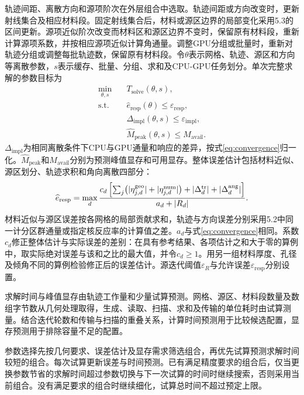 \documentclass[UTF8, zihao=-4, fontset=none, a4paper]{ctexart}
\begin{document}
轨迹间距、离散方向和源项阶次在外层组合中选取。轨迹间距或方向改变时，更新射线集合及相应材料段。固定射线集合后，材料或源区边界的局部变化采用5.3的区间更新。源项近似阶次改变而材料区和源区边界不变时，保留原有材料段，重新计算源项系数，并按相应源项近似计算角通量。调整GPU分组或批量时，重新对轨迹分组或调整每批轨迹数，保留原有材料段。令$\theta$表示网格、轨迹、源区和方向等离散参数，$s$表示缓存、批量、分组、求和及CPU-GPU任务划分。单次完整求解的参数目标为
\begin{equation}
\begin{aligned}
\min_{\theta,s}\quad &T_{\mathrm{solve}}(\theta,s),\\
\text{s.t.}\quad &\widehat e_{\mathrm{resp}}(\theta)\leq\varepsilon_{\mathrm{resp}},\\
&\Delta_{\mathrm{impl}}(\theta,s)\leq\varepsilon_{\mathrm{impl}},\\
&\widehat M_{\mathrm{peak}}(\theta,s)\leq M_{\mathrm{avail}}.
\end{aligned}
\label{eq:joint_selection}
\end{equation}
$\Delta_{\mathrm{impl}}$为相同离散条件下CPU与GPU通量和响应的差异，按式\eqref{eq:convergence}归一化。$\widehat M_{\mathrm{peak}}$和$M_{\mathrm{avail}}$分别为预测峰值显存和可用显存。整体误差估计包括材料近似、源区划分、轨迹求积和角向离散四部分：
\begin{equation}
\widehat e_{\mathrm{resp}}=
\max_d\frac{c_d\left[\sum_j\bigl(|\eta^{\rm geo}_{j,d}|+|\eta^{\rm num}_{j,d}|\bigr)+|\Delta^{\rm tr}_d|+|\Delta^{\rm ang}_d|\right]}{a_d+|R_d|}.
\label{eq:response_indicator}
\end{equation}
材料近似与源区误差按各网格的局部贡献求和，轨迹与方向误差分别采用5.2中同一计分区群通量或指定核反应率的计算值之差。$a_d$与式\eqref{eq:convergence}相同。系数$c_d$修正整体估计与实际误差的差别：在具有参考结果、各项估计之和大于零的算例中，取实际绝对误差与该和之比的最大值，并令$c_d\geq1$。用另一组材料厚度、孔径及倾角不同的算例检验修正后的误差估计。源迭代阈值$\varepsilon_R$与允许误差$\varepsilon_{\mathrm{resp}}$分别设置。

求解时间与峰值显存由轨迹工作量和少量试算预测。网格、源区、材料段数量及数组字节数从几何处理取得，生成、读取、扫描、求和及传输的单位耗时由试算测量。结合迭代轮数和传输与扫描的重叠关系，计算时间预测用于比较候选配置，显存预测用于排除容量不足的配置。

参数选择先按几何要求、误差估计及显存需求筛选组合，再优先试算预测求解时间较短的组合。每次试算更新误差与时间预测。已有满足精度要求的组合后，仅当更换参数节省的求解时间超过参数切换与下一次试算的时间时继续搜索，否则采用当前组合。没有满足要求的组合时继续细化，试算总时间不超过预定上限。
\end{document}
